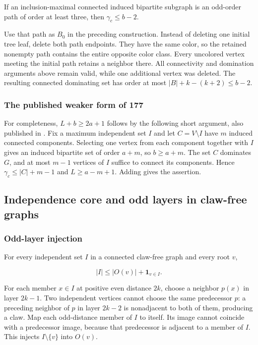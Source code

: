 \documentclass[11pt,a4paper]{article}
\theoremstyle{definition}\newtheorem{definition}[theorem]{Definition}
\theoremstyle{remark}\newtheorem{remark}[theorem]{Remark}
\begin{document}
If an inclusion-maximal connected induced bipartite subgraph is an
odd-order path of order at least three, then \(\gamma_c\le b-2\).

Use that path as \(B_0\) in the preceding construction. Instead of
deleting one initial tree leaf, delete both path endpoints. They have
the same color, so the retained nonempty path contains the entire
opposite color class. Every uncolored vertex meeting the initial path
retains a neighbor there. All connectivity and domination arguments
above remain valid, while one additional vertex was deleted. The
resulting connected dominating set has order at most
\(|B|+k-(k+2)\le b-2\).

\subsubsection{The published weaker form of
177}\label{late:claw:the-published-weaker-form-of-177}

For completeness, \(L+b\ge2a+1\) follows by the following short
argument, also published in \cite{late:DW}. Fix a maximum independent set
\(I\) and let \(C=V\setminus I\) have \(m\) induced connected
components. Selecting one vertex from each component together with \(I\)
gives an induced bipartite set of order \(a+m\), so \(b\ge a+m\). The
set \(C\) dominates \(G\), and at most \(m-1\) vertices of \(I\) suffice
to connect its components. Hence \(\gamma_c\le |C|+m-1\) and
\(L\ge a-m+1\). Adding gives the assertion.

\subsection{Independence core and odd layers in claw-free
graphs}\label{late:claw:independence-core-and-odd-layers-in-claw-free-graphs}

\subsubsection{Odd-layer injection}\label{late:claw:odd-layer-injection}

For every independent set \(I\) in a connected claw-free graph and every
root \(v\),

\[|I|\le |O(v)|+\mathbf 1_{v\in I}.\]

For each member \(x\in I\) at positive even distance \(2k\), choose a
neighbor \(p(x)\) in layer \(2k-1\). Two independent vertices cannot
choose the same predecessor \(p\): a preceding neighbor of \(p\) in
layer \(2k-2\) is nonadjacent to both of them, producing a claw. Map
each odd-distance member of \(I\) to itself. Its image cannot coincide
with a predecessor image, because that predecessor is adjacent to a
member of \(I\). This injects \(I\setminus\{v\}\) into \(O(v)\).
\end{document}
